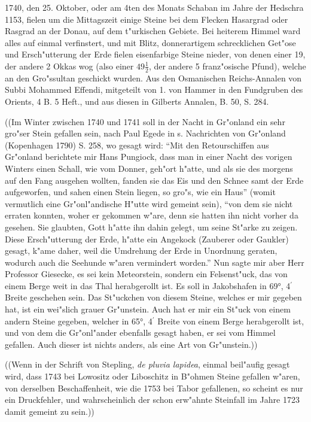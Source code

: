 \documentclass[a4paper, 11pt, oneside, polutonikogreek, german]{article}
\begin{document}
1740, den 25. Oktober, oder am 4ten des Monats Schaban im Jahre der Hedschra 1153, fielen um die Mittagszeit einige Steine bei dem Flecken Hasargrad oder Rasgrad an der Donau, auf dem t"urkischen Gebiete. Bei heiterem Himmel ward alles auf einmal verfinstert, und mit Blitz, donnerartigem schrecklichen Get"ose und Ersch"utterung der Erde fielen eisenfarbige Steine nieder, von denen einer 19, der andere 2 Okkas wog (also einer $\mathfrak{49\frac{1}{2}}$, der andere 5 franz"osische Pfund), welche an den Gro"ssultan geschickt wurden. Aus den Osmanischen Reichs-Annalen von Subbi Mohammed Effendi, mitgeteilt von 1. von Hammer in den Fundgruben des Orients, 4 B. 5 Heft., und aus diesen in Gilberts Annalen, B. 50, S. 284.

((Im Winter zwischen 1740 und 1741 soll in der Nacht in Gr"onland ein sehr gro"ser Stein gefallen sein, nach Paul Egede in s. Nachrichten von Gr"onland (Kopenhagen 1790) S. 258, wo gesagt wird: "`Mit den Retourschiffen aus Gr"onland berichtete mir Hans Pungiock, dass man in einer Nacht des vorigen Winters einen Schall, wie vom Donner, geh"ort h"atte, und als sie des morgens auf den Fang ausgehen wollten, fanden sie das Eis und den Schnee samt der Erde aufgeworfen, und sahen einen Stein liegen, so gro"s, wie ein Haus"' (womit vermutlich eine Gr"onl"andische H"utte wird gemeint sein), "`von dem sie nicht erraten konnten, woher er gekommen w"are, denn sie hatten ihn nicht vorher da gesehen. Sie glaubten, Gott h"atte ihn dahin gelegt, um seine St"arke zu zeigen. Diese Ersch"utterung der Erde, h"atte ein Angekock (Zauberer oder Gaukler) gesagt, k"ame daher, weil die Umdrehung der Erde in Unordnung geraten, wodurch auch die Seehunde w"aren vermindert worden."' Nun sagte mir aber Herr Professor Giesecke, es sei kein Meteorstein, sondern ein Felsenst"uck, das von einem Berge weit in das Thal herabgerollt ist. Es soll in Jakobshafen in 69°, 4$^{\prime}$ Breite geschehen sein. Das St"uckchen von diesem Steine, welches er mir gegeben hat, ist ein wei"slich grauer Gr"unstein. Auch hat er mir ein St"uck von einem andern Steine gegeben, welcher in 65°, 4$^{\prime}$ Breite von einem Berge herabgerollt ist, und von dem die Gr"onl"ander ebenfalls gesagt haben, er sei vom Himmel gefallen. Auch dieser ist nichts anders, als eine Art von Gr"unstein.))

((Wenn in der Schrift von Stepling, \emph{de pluvia lapidea}, einmal beil"aufig gesagt wird, dass 1743 bei Lowositz oder Liboschitz in B"ohmen Steine gefallen w"aren, von derselben Beschaffenheit, wie die 1753 bei Tabor gefallenen, so scheint es nur ein Druckfehler, und wahrscheinlich der schon erw"ahnte Steinfall im Jahre 1723 damit gemeint zu sein.))
\end{document}
